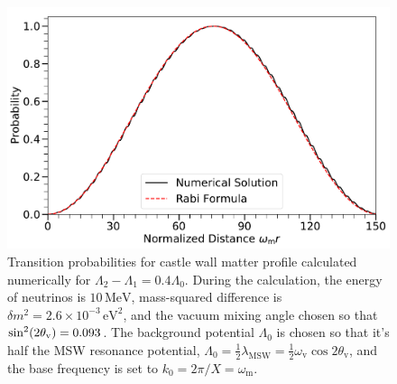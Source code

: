 \begin{figure}[!htbp]
        \includegraphics[width=\columnwidth]{chapters/assets/matter/castle-wall-with-legend}%
    \caption{Transition probabilities for castle wall matter profile calculated numerically for $\Lambda_2-\Lambda_1=0.4 \Lambda_0$. During the calculation, the energy of neutrinos is $10\,\mathrm{MeV}$, mass-squared difference is $\delta m^2=2.6\times 10^{-3}\,\mathrm{eV^2}$, and the vacuum mixing angle chosen so that $\sin^2(2\theta_\mathrm v)=0.093$. The background potential $\Lambda_0$ is chosen so that it's half the MSW resonance potential, $\Lambda_0 = \frac{1}{2}\lambda_{\mathrm{MSW}}=\frac{1}{2}\omega_{\mathrm{v}}\cos 2\theta_{\mathrm v}$, and the base frequency is set to $k_0 = 2\pi/X = \omega_{\mathrm{m}}$.
                 }
    \label{fig-akhmedovOscPlt}
\end{figure}


